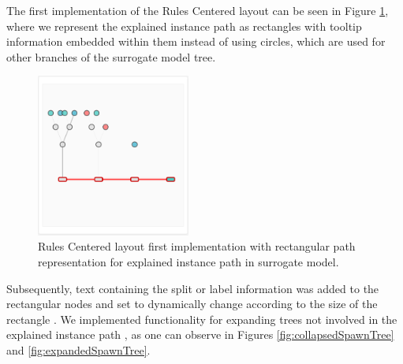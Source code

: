 The first implementation of the Rules Centered layout \cite{git26commit} can be seen in Figure \ref{fig:Tree spawn first implementation}, where we represent the explained instance path as rectangles with tooltip information embedded within them instead of using circles, which are used for other branches of the surrogate model tree.

\begin{figure}[h]
    \centering
    \includegraphics[width=0.45\textwidth]{images/tree spawn 1.png}
    \caption{Rules Centered layout first implementation with rectangular path representation for explained instance path in surrogate model.}
    \label{fig:Tree spawn first implementation}
\end{figure}

Subsequently, text containing the split or label information was added to the rectangular nodes and set to dynamically change according to the size of the rectangle \cite{git29commit}. We implemented functionality for expanding trees not involved in the explained instance path \cite{git30commit}, as one can observe in Figures \ref{fig:collapsedSpawnTree} and \ref{fig:expandedSpawnTree}.

